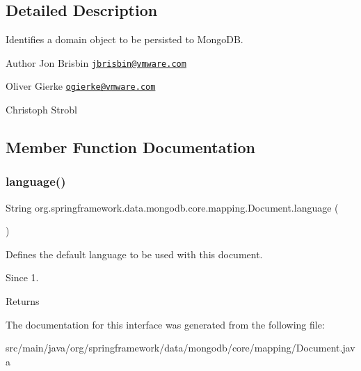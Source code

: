 \subsection{Detailed Description}
Identifies a domain object to be persisted to Mongo\+DB.

\begin{DoxyAuthor}{Author}
Jon Brisbin \href{mailto:jbrisbin@vmware.com}{\tt jbrisbin@vmware.\+com} 

Oliver Gierke \href{mailto:ogierke@vmware.com}{\tt ogierke@vmware.\+com} 

Christoph Strobl 
\end{DoxyAuthor}


\subsection{Member Function Documentation}
\mbox{\label{interfaceorg_1_1springframework_1_1data_1_1mongodb_1_1core_1_1mapping_1_1Document_ad679d7be1db53bf98c7c412f777a7e3f}} 
\subsubsection{\texorpdfstring{language()}{language()}}
{\footnotesize\ttfamily String org.\+springframework.\+data.\+mongodb.\+core.\+mapping.\+Document.\+language (\begin{DoxyParamCaption}{ }\end{DoxyParamCaption})}

Defines the default language to be used with this document.

\begin{DoxySince}{Since}
1. 
\end{DoxySince}
\begin{DoxyReturn}{Returns}

\end{DoxyReturn}


The documentation for this interface was generated from the following file\+:\begin{DoxyCompactItemize}
\item 
src/main/java/org/springframework/data/mongodb/core/mapping/Document.\+java\end{DoxyCompactItemize}
